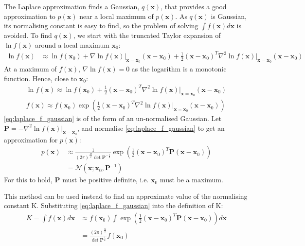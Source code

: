 \documentclass[a4paper]{article}
\begin{document}
    The Laplace approximation finds a Gaussian, $q(\bm{x})$, that provides a good approximation to $p(\bm{x})$ near a local maximum of $p(\bm{x})$.
    As $q(\bm{x})$ is Gaussian, its normalising constant is easy to find, so the problem of solving $\int f(\bm{x}) d\bm{x}$ is avoided.
    To find $q(\bm{x})$, we start with the truncated Taylor expansion of $\ln f(\bm{x})$ around a local maximum $\bm{x}_0$:
    \begin{align}
        \nonumber
        \ln f(\bm{x}) &\approx \ln f(\bm{x}_0) + \nabla \ln f(\bm{x}) \big|_{\bm{x} = \bm{x}_0} (\bm{x} - \bm{x}_0)
        + \frac{1}{2} (\bm{x} - \bm{x}_0)^T \nabla^2 \ln f(\bm{x}) \big|_{\bm{x} = \bm{x}_0} (\bm{x} - \bm{x}_0)
    \end{align}
    At a maximum of $f(\bm{x})$, $\nabla \ln f(\bm{x}) = 0$ as the logarithm is a monotonic function.
    Hence, close to $\bm{x}_0$:
    \begin{align}
        \ln f(\bm{x}) \approx \ln f(\bm{x}_0) + \frac{1}{2} (\bm{x} - \bm{x}_0)^T \nabla^2 \ln f(\bm{x}) \big|_{\bm{x} = \bm{x}_0} (\bm{x} - \bm{x}_0) \nonumber \\
        f(\bm{x}) \approx f(\bm{x}_0) \exp \left(\frac{1}{2} (\bm{x} - \bm{x}_0)^T \nabla^2 \ln f(\bm{x}) \big|_{\bm{x} = \bm{x}_0} (\bm{x} - \bm{x}_0) \right)
        \label{eq:laplace_f_gaussian}
    \end{align}
    \autoref{eq:laplace_f_gaussian} is of the form of an un-normalised Gaussian. Let $\bm{P} = -\nabla^2 \ln f(\bm{x})\big|_{\bm{x} = \bm{x}_0}$,
    and normalise \autoref{eq:laplace_f_gaussian} to get an approximation for $p(\bm{x})$:
    \begin{align}
        p(\bm{x}) &\approx \frac{1}{(2\pi)^\frac{M}{2} \det\bm{P}^{-\frac{1}{2}}} \exp \left(\frac{1}{2} (\bm{x} - \bm{x}_0)^T \bm{P} (\bm{x} - \bm{x}_0) \right) \nonumber \\
        &= \mathcal{N}(\bm{x}; \bm{x}_0, \bm{P}^{-1})
        \label{eq:laplace_approximation}
    \end{align}
    For this to hold, $\bm{P}$ must be positive definite, i.e. $\bm{x}_0$ must be a maximum.

    This method can be used instead to find an approximate value of the normalising constant K. Substituting
    \autoref{eq:laplace_f_gaussian} into the definition of K:
    \begin{align}
        K = \int f(\bm{x}) d\bm{x} &\approx f(\bm{x}_0) \int \exp \left(\frac{1}{2} (\bm{x} - \bm{x}_0)^T \bm{P} (\bm{x} - \bm{x}_0) \right) d\bm{x} \nonumber \\
        &= \frac{(2\pi)^\frac{N}{2}}{\det \bm{P}^\frac{1}{2}} f(\bm{x}_0)
        \label{eq:normalising_constant}
    \end{align}
\end{document}
